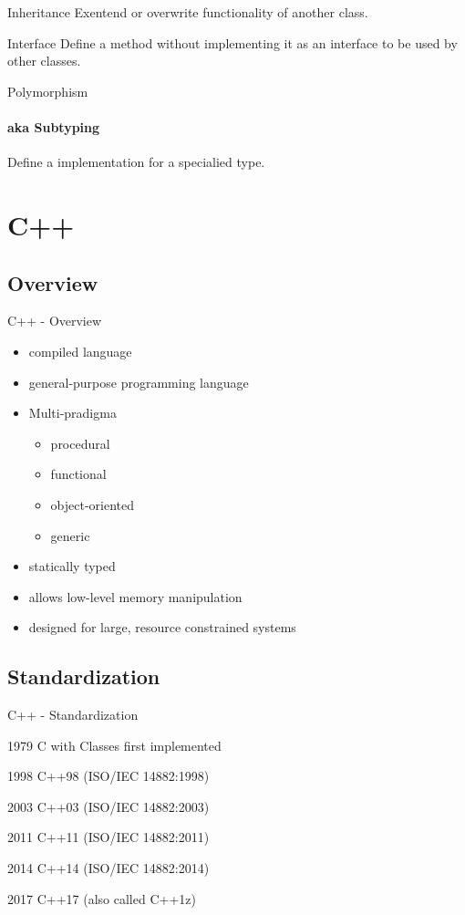 \documentclass{beamer}
\begin{document}
\begin{frame}{Inheritance}
Exentend or overwrite functionality of another class.
\end{frame}

\begin{frame}{Interface}
Define a method without implementing it as an interface to be used by other
classes.
\end{frame}

\begin{frame}{Polymorphism}
\framesubtitle{aka Subtyping}
Define a implementation for a specialied type.
\end{frame}

\section{C++}
\subsection{Overview}
\begin{frame}{C++ - Overview}
\begin{itemize}
  \item compiled language
  \item general-purpose programming language
  \item Multi-pradigma
  \begin{itemize}
    \item procedural
    \item functional
    \item object-oriented
    \item generic
  \end{itemize}
  \item statically typed
  \item allows low-level memory manipulation
  \item designed for large, resource constrained systems 
\end{itemize}
\end{frame}

\subsection{Standardization}
\begin{frame}{C++ - Standardization}
\itemize{}
\item[1979] C with Classes first implemented 
\item[1998] C++98 (ISO/IEC 14882:1998) 
\item[2003] C++03 (ISO/IEC 14882:2003)
\item[2011] C++11 (ISO/IEC 14882:2011)
\item[2014] C++14 (ISO/IEC 14882:2014)
\item[2017] C++17 (also called C++1z)
\end{frame}
\end{document}
